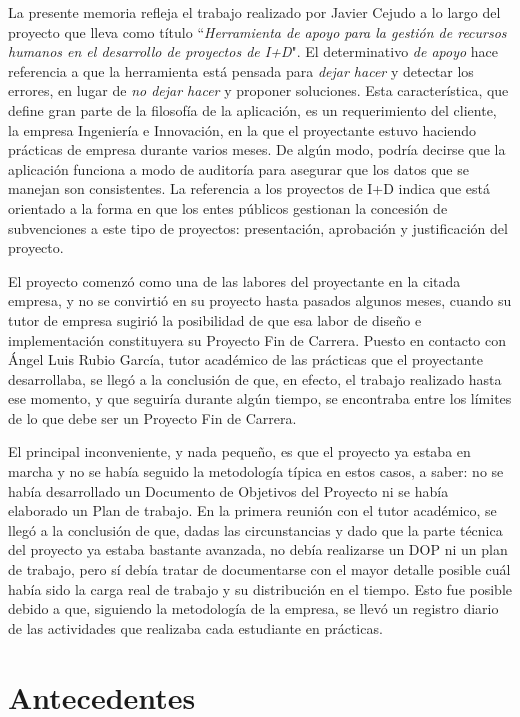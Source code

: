 La presente memoria refleja el trabajo realizado por Javier Cejudo a lo largo
del proyecto que lleva como título ``\textit{Herramienta de apoyo para la
gestión de recursos humanos en el desarrollo de proyectos de I+D}". El
determinativo \textit{de apoyo} hace referencia a que la herramienta está
pensada para \textit{dejar hacer} y detectar los errores, en lugar de \textit{no
dejar hacer} y proponer soluciones. Esta característica, que define gran parte
de la filosofía de la aplicación, es un requerimiento del cliente, la empresa
Ingeniería e Innovación, en la que el proyectante estuvo haciendo prácticas de
empresa durante varios meses. De algún modo, podría decirse que la aplicación
funciona a modo de auditoría para asegurar que los datos que se manejan son
consistentes. La referencia a los proyectos de I+D indica que está orientado a
la forma en que los entes públicos gestionan la concesión de subvenciones a este
tipo de proyectos: presentación, aprobación y justificación del proyecto.

El proyecto comenzó como una de las labores del proyectante en la citada
empresa, y no se convirtió en su proyecto hasta pasados algunos meses, cuando
su tutor de empresa sugirió la posibilidad de que esa labor de diseño e
implementación constituyera su Proyecto Fin de Carrera. Puesto en
contacto con Ángel Luis Rubio García, tutor académico de las
prácticas que el proyectante desarrollaba, se llegó a la conclusión de que, en
efecto, el trabajo realizado hasta ese momento, y que seguiría durante algún
tiempo, se encontraba entre los límites de lo que debe ser un Proyecto Fin de
Carrera.

El principal inconveniente, y nada pequeño, es que el proyecto ya estaba en
marcha y no se había seguido la metodología típica en estos casos, a saber: no
se había desarrollado un Documento de Objetivos del Proyecto ni se había
elaborado un Plan de trabajo. En la primera reunión con el tutor académico, se
llegó a la conclusión de que, dadas las circunstancias y dado que la parte
técnica del proyecto ya estaba bastante avanzada, no debía realizarse un DOP ni
un plan de trabajo, pero sí debía tratar de documentarse con el mayor detalle
posible cuál había sido la carga real de trabajo y su distribución en el
tiempo. Esto fue posible debido a que, siguiendo la metodología de la empresa,
se llevó un registro diario de las actividades que realizaba cada estudiante en
prácticas.

\section{Antecedentes}
\label{sec:antecedentes}

